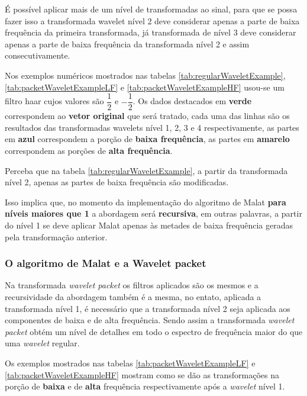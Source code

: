 \begin{myenv}{1.5}
				\par É possível aplicar mais de um nível de transformadas ao sinal, para que se possa fazer isso a transformada wavelet nível 2 deve considerar apenas a parte de baixa frequência da primeira transformada, já transformada de nível 3 deve considerar apenas a parte de baixa frequência da transformada nível 2 e assim consecutivamente.
				
				\par Nos exemplos numéricos mostrados nas tabelas \ref{tab:regularWaveletExample}, \ref{tab:packetWaveletExampleLF} e \ref{tab:packetWaveletExampleHF} usou-se um filtro haar cujos valores são $\dfrac{1}{2}$ e $-\dfrac{1}{2}$. Os dados destacados em \textbf{verde} correspondem ao \textbf{vetor original} que será tratado, cada uma das linhas são os resultados das transformadas wavelets nível 1, 2, 3 e 4 respectivamente, as partes em \textbf{azul} correspondem a porção de \textbf{baixa frequência}, as partes em \textbf{amarelo} correspondem as porções de \textbf{alta frequência}.
				
				\par Perceba que na tabela \ref{tab:regularWaveletExample}, a partir da transformada nível 2, apenas as partes de baixa frequência são modificadas.
				
				\par Isso implica que, no momento da implementação do algoritmo de Malat \textbf{para níveis maiores que 1} a abordagem será \textbf{recursiva}, em outras palavras, a partir do nível 1 se deve aplicar Malat apenas às metades de baixa frequência geradas pela transformação anterior.
				
				

			\subsubsection{O algoritmo de Malat e a Wavelet packet}
				\par Na transformada \textit{wavelet packet} os filtros aplicados são os mesmos e a recursividade da abordagem também é a mesma, no entato, aplicada a transformada nível 1, é necessário que a transformada nível 2 seja aplicada aos componentes de baixa e de alta frequência. Sendo assim a transformada \textit{wavelet packet} obtém um nível de detalhes em todo o espectro de frequência maior do que uma \textit{wavelet} regular. 
				
				\par Os exemplos mostrados nas tabelas \ref{tab:packetWaveletExampleLF} e \ref{tab:packetWaveletExampleHF} mostram como se dão as transformações na porção de \textbf{baixa} e de \textbf{alta} frequência respectivamente após a \textit{wavelet} nível 1.


\end{myenv}
